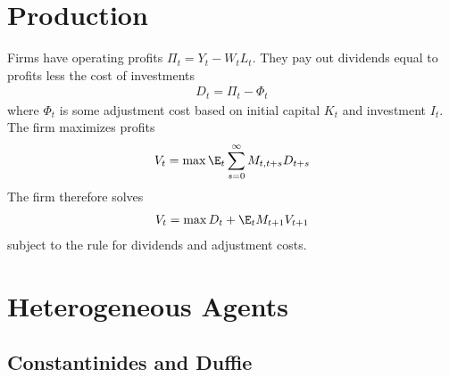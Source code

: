 \documentclass[12pt]{article}
\theoremstyle{plain}
\theoremstyle{definition}
\theoremstyle{remark}
\newcommand{\sumsinfz}{\sum^\infty_{s=0}}
\begin{document}
\begin{multicols*}{2}
\clearpage
\section{Production}

Firms have operating profits $\Pi_t = Y_t - W_tL_t$. They pay out
dividends equal to profits less the cost of investments
\begin{align*}
  D_t = \Pi_t - \Phi_t
\end{align*}
where $\Phi_t$ is some adjustment cost based on initial capital $K_t$
and investment $I_t$.
The firm maximizes profits
\begin{align*}
  V_t = \max \E_t\sumsinfz M_{t,t+s} D_{t+s}
\end{align*}
The firm therefore solves
\begin{align*}
  V_t = \max D_t + \E_t M_{t+1} V_{t+1}
\end{align*}
subject to the rule for dividends and adjustment costs.





\clearpage
\section{Heterogeneous Agents}

\subsection{Constantinides and Duffie}


\end{multicols*}
\end{document}
